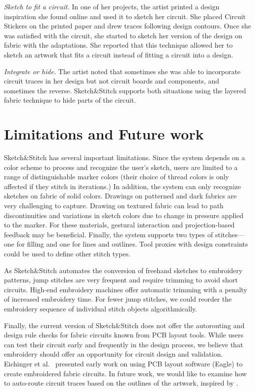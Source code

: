 \documentclass{sigchi}
\begin{document}
\textit{Sketch to fit a circuit.} In one of her projects, the artist printed a design inspiration she found online and used it to sketch her circuit. She placed Circuit Stickers on the printed paper and drew traces following design contours. Once she was satisfied with the circuit, she started to sketch her version of the design on fabric with the adaptations. She reported that this technique allowed her to sketch an artwork that fits a circuit instead of fitting a circuit into a design.

\textit{Integrate or hide.} The artist noted that sometimes she was able to incorporate circuit traces in her design but not circuit boards and components, and sometimes the reverse. Sketch\&Stitch supports both situations using the layered fabric technique to hide parts of the circuit.


\section{Limitations and Future work}

Sketch\&Stitch has several important limitations. Since the system depends on a color scheme to process and recognize the user's sketch, users are limited to a range of distinguishable marker colors (their choice of thread colors is only affected if they stitch in iterations.)
In addition, the system can only recognize sketches on fabric of solid colors. Drawings on patterned and dark fabrics are very challenging to capture.  
Drawing on textured fabric can lead to path discontinuities and variations in sketch colors due to change in pressure applied to the marker. For these materials, gestural interaction and projection-based feedback may be beneficial. Finally, the system supports two types of stitches---one for filling and one for lines and outlines. Tool proxies with design constraints \cite{mueller2012interactive} could be used to define other stitch types.


As Sketch\&Stitch automates the conversion of freehand sketches to embroidery patterns, jump stitches are very frequent and require trimming to avoid short circuits. High-end embroidery machines offer automatic trimming with a penalty of increased embroidery time. For fewer jump stitches, we could reorder the embroidery sequence of individual stitch objects algorithmically.

Finally, the current version of Sketch\&Stitch does not offer the autorouting and design rule checks for fabric circuits known from PCB layout tools. While users can test their circuit early and frequently in the design process, we believe that embroidery should offer an opportunity for circuit design and validation. Eichinger et al.\ \cite{eichinger2007using} presented early work on using PCB layout software (Eagle) to create embroidered fabric circuits. 
In future work, we would like to examine how to auto-route circuit traces based on the outlines of the artwork, inspired by \cite{savage2014series}.
\end{document}
